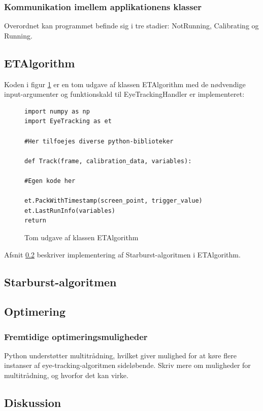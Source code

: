 \documentclass[rapport.tex]{subfiles}
\begin{document}
	\subsubsection{Kommunikation imellem applikationens klasser}	
	
	Overordnet kan programmet befinde sig i tre stadier: NotRunning, Calibrating og Running. 	
	
	\subsection{ETAlgorithm}
	Koden i figur \ref{list:emptyalg} er en tom udgave af klassen ETAlgorithm med de nødvendige input-argumenter og funktionskald til EyeTrackingHandler er implementeret:

\begin{figure}
	\caption{Tom udgave af klassen ETAlgorithm}
	\label{list:emptyalg}
\begin{lstlisting}
import numpy as np
import EyeTracking as et

#Her tilfoejes diverse python-biblioteker

def Track(frame, calibration_data, variables):

#Egen kode her 

et.PackWithTimestamp(screen_point, trigger_value)
et.LastRunInfo(variables)
return
\end{lstlisting}
\end{figure}

	
	
	Afsnit \ref{StarburstImpl} beskriver implementering af Starburst-algoritmen i ETAlgorithm.
	\subsection{Starburst-algoritmen}
	\label{StarburstImpl}
	\subsection{Optimering}
	
	\subsubsection{Fremtidige optimeringsmuligheder}
	Python understøtter multitrådning, hvilket giver mulighed for at køre flere instanser af eye-tracking-algoritmen sideløbende. Skriv mere om muligheder for multitrådning, og hvorfor det kan virke.
	\subsection{Diskussion}
		
\end{document}
